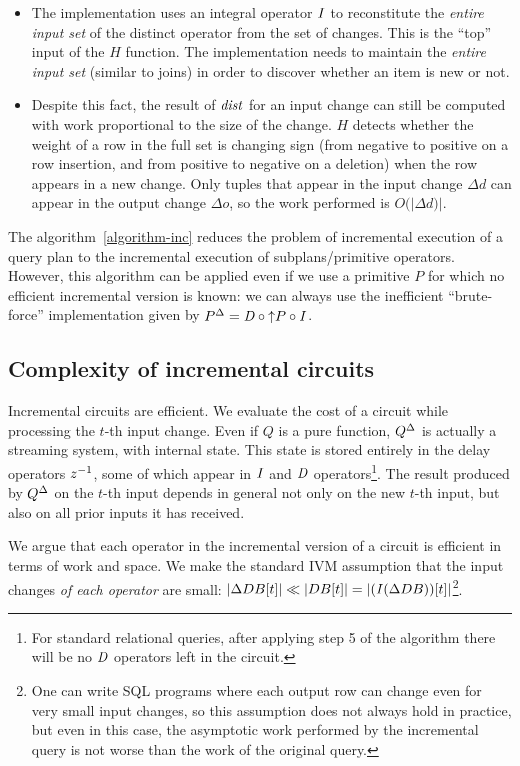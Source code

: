 \begin{itemize}
  \item The implementation uses an integral operator $\mathit{I}$ to
    reconstitute the \emph{entire input set} of the distinct operator
    from the set of changes.  This is the ``top'' input of the $H$
    function.  The implementation needs to maintain the \emph{entire
    input set} (similar to joins) in order to discover whether an item
    is new or not.
  \item Despite this fact, the result of $\mathit{dist}$ for an input
    change can still be computed with work proportional to the size of
    the change.  $H$ detects whether the weight of a row in the full
    set is changing sign (from negative to positive on a row
    insertion, and from positive to negative on a deletion) when the
    row appears in a new change.  Only tuples that appear in
    the input change $\Delta d$ can appear in the output change
    $\Delta o$, so the work performed is $O(|\Delta d)|$.
\end{itemize}

The algorithm~\ref{algorithm-inc} reduces the problem of incremental
execution of a query plan to the incremental execution of
sub\-plans/primitive operators.  However, this algorithm can be
applied even if we use a primitive $P$ for which no efficient
incremental version is known: we can always use the inefficient
``brute-force'' implementation given by ${P}^{\Delta} = \mathit{D} \circ {\uparrow}P
\circ \mathit{I}$.



\subsection{Complexity of incremental circuits}\label{sec:complexity}

Incremental circuits are efficient.  We evaluate the cost of a circuit
while processing the $t$-th input change.  Even if $Q$ is a pure
function, ${Q}^{\Delta}$ is actually a streaming system, with internal
state.  This state is stored entirely in the delay operators $z^{-1}$,
some of which appear in $\mathit{I}$ and $\mathit{D}$ operators\footnote{For
standard relational queries, after applying step 5 of the algorithm
there will be no $\mathit{D}$ operators left in the circuit.}.  The result
produced by ${Q}^{\Delta}$ on the $t$-th input depends in general not only
on the new $t$-th input, but also on all prior inputs it has received.

We argue that each operator in the incremental version of a circuit is
efficient in terms of work and space.  We make the standard IVM
assumption that the input changes \emph{of each operator} are small:
$|\Delta DB[t]| \ll |DB[t]| = |(\mathit{I}(\Delta DB))[t]|$\footnote{One can
write SQL programs where each output row can change even for very
small input changes, so this assumption does not always hold in
practice, but even in this case, the asymptotic work performed by the
incremental query is not worse than the work of the original query.}.

